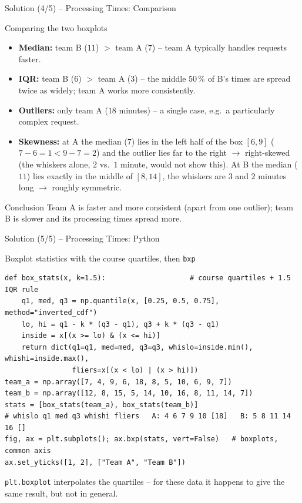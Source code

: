 \documentclass[aspectratio=169,11pt]{beamer}
\begin{document}
\begin{frame}{Solution (4/5) -- Processing Times: Comparison}
  \begin{exampleblock}{Comparing the two boxplots}
    \begin{itemize}\setlength{\itemsep}{1pt}
      \item \textbf{Median:} team B ($11$) $>$ team A ($7$) -- team A typically
        handles requests faster.
      \item \textbf{IQR:} team B ($6$) $>$ team A ($3$) -- the middle $50\,\%$
        of B's times are spread twice as widely; team A works more consistently.
      \item \textbf{Outliers:} only team A ($18$ minutes) -- a single case,
        e.g.\ a particularly complex request.
      \item \textbf{Skewness:} at A the median ($7$) lies in the left half of the
        box $[6,9]$ ($7-6=1 < 9-7=2$) and the outlier lies far to the right
        $\rightarrow$ right-skewed (the whiskers alone, $2$ vs.\ $1$ minute,
        would not show this). At B the median ($11$) lies exactly in the middle
        of $[8,14]$, the whiskers are $3$ and $2$ minutes long $\rightarrow$
        roughly symmetric.
    \end{itemize}
  \end{exampleblock}
  \begin{alertblock}{Conclusion}
    Team A is faster and more consistent (apart from one outlier); team B is
    slower and its processing times spread more.
  \end{alertblock}
\end{frame}

\begin{frame}[fragile]{Solution (5/5) -- Processing Times: Python}
  \begin{block}{Boxplot statistics with the course quartiles, then \texttt{bxp}}
    \begin{lstlisting}
def box_stats(x, k=1.5):                    # course quartiles + 1.5 IQR rule
    q1, med, q3 = np.quantile(x, [0.25, 0.5, 0.75], method="inverted_cdf")
    lo, hi = q1 - k * (q3 - q1), q3 + k * (q3 - q1)
    inside = x[(x >= lo) & (x <= hi)]
    return dict(q1=q1, med=med, q3=q3, whislo=inside.min(), whishi=inside.max(),
                fliers=x[(x < lo) | (x > hi)])
team_a = np.array([7, 4, 9, 6, 18, 8, 5, 10, 6, 9, 7])
team_b = np.array([12, 8, 15, 5, 14, 10, 16, 8, 11, 14, 7])
stats = [box_stats(team_a), box_stats(team_b)]
# whislo q1 med q3 whishi fliers   A: 4 6 7 9 10 [18]   B: 5 8 11 14 16 []
fig, ax = plt.subplots(); ax.bxp(stats, vert=False)   # boxplots, common axis
ax.set_yticks([1, 2], ["Team A", "Team B"])
    \end{lstlisting}
  \end{block}
  \footnotesize \texttt{plt.boxplot} interpolates the quartiles -- for these data it
  happens to give the same result, but not in general.
\end{frame}
\end{document}
